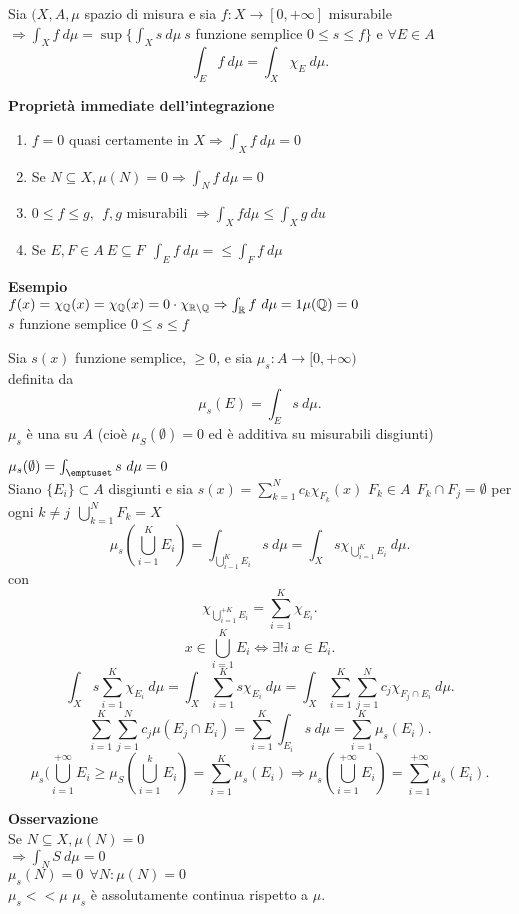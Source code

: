 \documentclass[12px]{article}
\begin{document}
\begin{defi}
	Sia $(X,A,\mu$ spazio di misura e sia  $f:X \rightarrow[0,+\infty]$ misurabile\\
	$ \Rightarrow \int_X f \ d\mu = \sup \{ \int_X s \ d\mu\ s$ funzione semplice $0\leq s\leq f\}$ e  $\forall E\in A$
	 \[
	\int_E f \ d\mu = \int_X \chi_E \ d\mu
	.\] 
\end{defi}
\textbf{Proprietà immediate dell'integrazione}
\begin{enumerate}
	\item $f = 0$ quasi certamente in $X \Rightarrow \int_X f \ d\mu =0$
	\item Se $N\subseteq X, \mu(N) = 0 \Rightarrow \int_N f\ d\mu = 0$ 
	\item $0\leq f\leq g, \ \ f,g$ misurabili $ \Rightarrow \int_X f d\mu\leq\int_X g \ du$ 
	\item Se $E,F \in A\ E\subseteq F\ \ \int_E f \ d\mu =\leq \int_F f\ d\mu$
\end{enumerate}
\textbf{Esempio}\\
$f(x) = \chi_{\mathbb{Q}}(x) = \chi_{\mathbb{Q}}(x) = 0\cdot \chi_{\mathbb{R}\setminus\mathbb{Q}} \Rightarrow \int_{\mathbb{R}} f \ d\mu = 1 \mu(\mathbb{Q}) = 0$ \\
$s$ funzione semplice $0\leq s \leq f$\\
\newpage
\begin{prop}
	Sia $s(x)$ funzione semplice, $\geq 0$, e sia $\mu_s : A \rightarrow [0,+\infty)$\\
	definita da 
	\[
	\mu_s(E) = \int_E s \ d\mu
	.\] 
	$\mu_s$ è una  su $A$ (cioè  $\mu_S(\emptyset) = 0$ ed è additiva su misurabili disgiunti)
\end{prop}
\begin{dimo}
	$\mu_s(\emptyset) = \int_\emptuset s\ d\mu = 0 $ \\
	Siano $\{E_i\}\subset A$ disgiunti e sia  $s(x) = \sum^{N}_{k=1}c_k\chi_{F_k}(x)$ $F_k\in A\ \ F_k\cap F_j = \emptyset$ per ogni  $k\neq j\ \ \bigcup^{N}_{k=1}F_k=X$ \\
	\[
		\mu_s \left( \bigcup^{K}_{i-1}E_i \right) = \int_{ \bigcup^{K}_{i-1}E_i}s \ d\mu = \int_X s \chi_{ \bigcup^{K}_{i = 1}E_i} \ d\mu
	.\] 
	con
	\[
		\chi_{ \bigcup^{+K}_{i = 1}E_i} = \sum^{K}_{i = 1}\chi_{E_i}
	.\] 
	\[
	x\in \bigcup^{K}_{i= 1}E_i \Leftrightarrow \exists ! i \ x\in E_i
	.\] 
	\[
		\int_X s \sum^{K}_{i= 1}\chi_{E_i}\ d\mu = \int_X \sum^{K}_{i=1}s\chi_{E_i} \ d\mu = \int_X \sum^{K}_{i=1} \sum^{N}_{j=1}c_j \chi_{F_j\cap E_i} \ d\mu
	.\] 
	\[
		\sum^{K}_{i=1} \sum^{N}_{j=1}c_j \mu(E_j \cap E_i)  = \sum^{K}_{i=1}\int_{E_i} s\ d\mu = \sum^{K}_{i=1}\mu_s(E_i)
	.\] 
	\[
	\mu_s( \bigcup^{+\infty}_{i = 1}E_i \geq \mu_S \left( \bigcup^{k}_{i=1}E_i \right) = \sum^{K}_{i=1}\mu_s(E_i) \Rightarrow \mu_s \left( \bigcup^{+\infty}_{i =1}E_i \right) = \sum^{+\infty}_{i=1}\mu_s(E_i)
	.\] 
\end{dimo}
\textbf{Osservazione}\\
Se $N\subseteq X, \mu(N) = 0$\\
 $ \Rightarrow  \int_N S\ d\mu = 0$ \\
 $\mu_s(N) =0 \ \ \forall N: \mu(N) = 0$\\
  $\mu_s << \mu$  $\mu_s$ è assolutamente continua rispetto a $\mu$.
\end{document}
